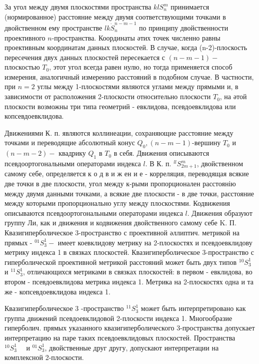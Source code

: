 \documentclass[10pt]{article}
\begin{document}
За угол между двумя плоскостями пространства $k l S_{n}^{m}$ принимается (нормированное) расстояние между двумя соответствующими точками в двойственном ему пространстве $l k \dot{S}_{n}^{n-m-1}$ по принципу двойственности проективного $n$-пространства. Координаты әтих точек численно равны проективным координатам данных плоскостей. В случае, когда (n-2)-плоскость пересечения двух данных плоскостей пересекается с $(n-m-1)-$ плоскостью $T_{0}$, этот угол всегда равен нулю, но тогда применяется способ измерения, аналогичный измерению расстояний в подобном случае. В частности, при $n=2$ углы между 1-плоскостями являются углами между прямыми и, в зависимости от расположения 2-плоскости относительно плоскости $T_{0}$, на әтой плоскости возможны три типа геометрий - евклидова, псевдоевклидова или копсевдоевклидова.



Движениями К. п. являются коллинеации, сохраняющие расстояние между точками и переводящие абсолютный конус $Q_{0},(n-m-1)$-вершину $T_{0}$ и $(n-m-2)-$ квадрику $Q_{1}$ в $T_{0}$ в себя. Движения описываются псевдоортогональными операторами индекса $l$. В К. п. ${ }^{l l} S_{2 m+1}^{m}$, двойственном самому себе, определяется к о д в и ж ен и е - корреляция, переводящая всякие две точки в две плоскости, угол между к-рыми пропорционален расстоянію между двумя данными точками, а всякие две плоскости - в две точки, расстояние между которыми пропорционально углу между плоскостями. Кодвижения описываются псевдоортогональными операторами индекса $l$. Движения образуют группу Ли, как и движения и кодвижения двойственного самому себе K. П. Квазигиперболическое 3-пространство с проективной әллиптич. метрикой на прямых - ${ }^{01} S_{3}^{1}-$ имеет коевклидову метрику на 2-плоскостях и псевдоевклидову метрику индекса 1 в связках плоскостей. Квазигиперболическое 3-пространство с гиперболической проективной метрикой расстояний может быть двух типов ${ }^{10} S_{3}^{1}$ и ${ }^{11} S_{3}^{1}$, отличающихся метриками в связках плоскостей: в первом - евклидова, во втором - псевдоевклидова метрика индекса 1. Метрика на 2-плоскостях одна и та же - копсевдоевклидова индекса 1.



Квазигиперболическое 3 -пространство ${ }^{11} S_{3}^{1}$ может быть интерпретировано как группа движений псевдоевклидовой 2-плоскости индекса 1. Многообразие гиперболич. прямых указанного квазигиперболического 3-пространства допускает интерпретацию на паре таких псевдоевклидовых плоскостей. Пространства ${ }^{10} S_{3}^{1} \quad$ и ${ }^{01} S_{3}^{1}$, двойственные друг другу, допускают интерпретации на комплексной 2-плоскости.
\end{document}
